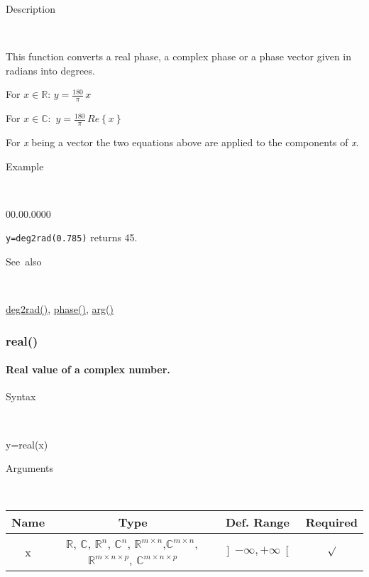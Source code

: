 \begin{description}
\item [Description]~
\end{description}
This function converts a real phase, a complex phase or a phase vector
given in radians into degrees. 

\medskip{}
For $x\in\mathbb{R}$: $y={\displaystyle \frac{180}{\pi}}\, x$

\medskip{}
For $x\mathbb{\mathbb{\in C}}:$ $y={\displaystyle \frac{180}{\pi}}\, Re\left\{ x\right\} $
\medskip{}

For \textit{x} being a vector the two equations above are
applied to the components of \textit{x}.

\begin{description}
\item [Example]~
\end{description}
\begin{lyxlist}{00.00.0000}
\item [\texttt{y=deg2rad(0.785)}]returns 45.
\end{lyxlist}
\begin{description}
\item [See~also]~
\end{description}
\textcolor{blue}{\hyperlink{deg2rad}{deg2rad()}}, \textcolor{blue}{\hyperlink{phase}{phase()}},
\textcolor{blue}{\hyperlink{arg}{arg()}}


\newpage
\subsubsection*{\hypertarget{real}{}{\Large real()}}


\paragraph{\label{par:Real}Real value of a complex number.}

\begin{description}
\item [Syntax]~
\end{description}
y=real(x)

\begin{description}
\item [Arguments]~
\end{description}
\begin{tabular}{|c|c|c|c|}
\hline 
Name&
Type&
Def. Range&
Required\tabularnewline
\hline
\hline 
x&
$\mathbb{R}$, $\mathbb{C}$, $\mathbb{R}^{n}$, $\mathbb{C}^{n}$,
$\mathbb{\mathbb{R}}^{m\times n}$,$\mathbb{\mathbb{C}}^{m\times n},$$\mathbb{\mathbb{R}}^{m\times n\times p}$,
$\mathbb{\mathbb{C}}^{m\times n\times p}$ &
$\left]-\infty,+\infty\right[$&
$\surd$\tabularnewline
\hline
\end{tabular}

